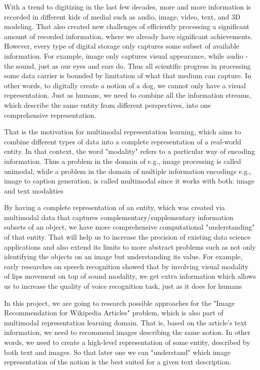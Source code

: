 \documentclass[runningheads]{llncs}
\begin{document}
With a trend to digitizing in the last few decades, more and more information is recorded in different kids of medial such as audio, image, video, text, and 3D modeling. That also created new challenges of efficiently processing a significant amount of recorded information, where we already have significant achievements. However, every type of digital storage only captures some subset of available information. For example, image only captures visual appearance, while  audio - the sound, just as our eyes and ears do. Thus all scientific progress in processing some data carrier is bounded by limitation of what that medium can capture. In other words, to digitally create a notion of a dog, we cannot only have a visual representation. Just as humans, we need to combine all the information streams, which describe the same entity from different perspectives, into one comprehensive representation.

That is the motivation for multimodal representation learning, which aims to combine different types of data into a complete representation of a real-world entity. In that context, the word "modality" refers to a particular way of encoding information. Thus a problem in the domain of e.g., image processing is called unimodal, while a problem in the domain of multiple information encodings e.g., image to caption generation, is called multimodal since it works with both: image and text modalities \cite{ref_survey} 

By having a complete representation of an entity, which was created via multimodal data that captures complementary/supplementary information subsets of an object, we have more comprehensive computational "understanding" of that entity. That will help us to increase the precision of existing data science applications and also extend its limits to more abstract problems such as not only identifying the objects on an image but understanding its value. For example\cite{ref_survey}, early researches on speech recognition showed that by involving visual modality of lips movement on top of sound modality, we get extra information which allows us to increase the quality of voice recognition task, just as it does for humans\cite{ref_human_voice_recognition}

In this project, we are going to research possible approaches for the "Image Recommendation for Wikipedia Articles" problem, which is also part of multimodal representation learning domain. That is, based on the article's text information, we need to recommend images describing the same notion. In other words, we need to create a high-level representation of some entity, described by both text and images. So that later one we can "understand" which image representation of the notion is the best suited for a given text description.
\end{document}
